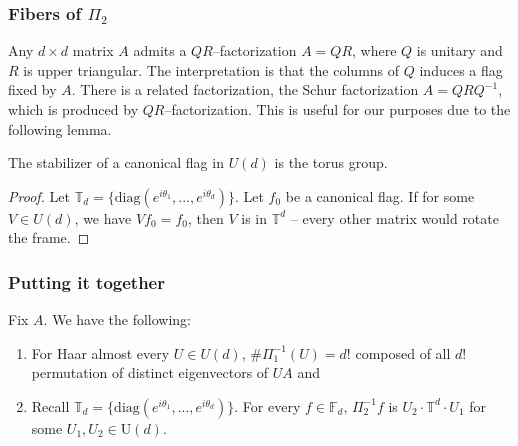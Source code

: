 \documentclass[10pt]{amsart}
\numberwithin{equation}{section}     %
\newcommand{\T}{\mathbb{T}}
\newcommand{\FF}{\mathbb{F}}
\newcommand{\GL}{\mathrm{GL}}
\newcommand{\U}{\mathrm{U}}
\begin{document}
\subsubsection{Fibers of $\Pi_2$}
Any $d \times d$ matrix $A$ admits a $QR$--factorization $A = QR$, where $Q$ is unitary and $R$ is upper triangular. The interpretation is that the columns of $Q$ induces a flag fixed by $A$. There is a related factorization, the Schur factorization $A = QRQ^{-1}$, which is produced by $QR$--factorization. This is useful for our purposes due to the following lemma. 


\begin{lemma}
\label{qr}


    The stabilizer of a canonical flag in $U(d)$ is the torus group.
    
\end{lemma}

\begin{proof}
    Let $\T_d = \{ \mathrm{diag}(e^{i\theta_1},...,e^{i\theta_d})\}$. Let $f_0$ be a canonical flag. If for some $V \in U(d)$, we have $Vf_0 = f_0$, then $V$ is in $\T^d$ -- every other matrix would rotate the frame. 
    
\end{proof}
\subsubsection{Putting it together}
\begin{proposition} \label{summary} Fix $A$. We have the following:
    \begin{enumerate}
        \item For Haar almost every $U \in U(d)$, $\# \Pi_1^{-1}(U) = d!$ composed of all $d!$ permutation of distinct eigenvectors of $UA$ and
        \item Recall $\T_d = \{ \mathrm{diag}(e^{i\theta_1},...,e^{i\theta_d})\}$. For every $f \in \FF_d$, $\Pi_2^{-1} f$ is $U_2 \cdot \T^d \cdot U_1$ for some $U_1, U_2 \in \U(d).$
    \end{enumerate}
\end{proposition}
\end{document}
